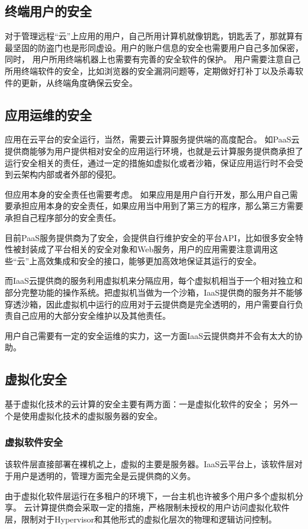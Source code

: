 \documentclass[a4paper]{ctexart}
\begin{document}
        \subsection{终端用户的安全}
            \par 对于管理远程“云”上应用的用户，自己所用计算机就像钥匙，钥匙丢了，那就算有最坚固的防盗门也是形同虚设。用户的账户信息的安全也需要用户自己多加保密，同时， 用户所用终端机器上也需要有完善的安全软件的保护。 用户需要注意自己所用终端软件的安全，比如浏览器的安全漏洞问题等，定期做好打补丁以及杀毒软件的更新，从终端角度确保云安全。

        \subsection{应用运维的安全}
            \par 应用在云平台的安全运行，当然，需要云计算服务提供端的高度配合。 如PaaS云提供商能够为用户提供相对安全的应用运行环境，也就是云计算服务提供商承担了运行安全相关的责任，通过一定的措施如虚拟化或者沙箱，保证应用运行时不会受到云架构内部或者外部的侵犯。
            \par {\color{red} 但应用本身的安全责任也需要考虑。 如果应用是用户自行开发，那么用户自己需要承担应用本身的安全责任，如果应用当中用到了第三方的程序，那么第三方需要承担自己程序部分的安全责任。}
            \par 目前PaaS服务提供商为了安全，会提供自行维护安全的平台API，比如很多安全特性被封装成了平台相关的安全对象和Web服务，用户的应用需要注意调用这些“云”上高效集成和安全的接口，能够更加高效地保证其运行的安全。
            \par 而IaaS云提供商的服务利用虚拟机来分隔应用，每个虚拟机相当于一个相对独立和部分完整功能的操作系统。把虚拟机当做为一个沙箱，IaaS提供商的服务并不能够穿透沙箱，因此虚拟机中运行的应用对于云提供商是完全透明的，用户需要自行负责自己应用的大部分安全维护以及其他责任。
            \par 用户自己需要有一定的安全运维的实力，这一方面IaaS云提供商并不会有太大的协助。

        \subsection{虚拟化安全}
        \par 基于虚拟化技术的云计算的安全主要有两方面：一是虚拟化软件的安全； 另外一个是使用虚拟化技术的虚拟服务器的安全。

        \subsubsection{虚拟软件安全}
            \par 该软件层直接部署在裸机之上，虚拟的主要是服务器。IaaS云平台上，该软件层对于用户是透明的，管理方面完全是云提供商的义务。
            \par 由于虚拟化软件层运行在多租户的环境下，一台主机也许被多个用户多个虚拟机分享。 云计算提供商会采取一定的措施，严格限制未授权的用户访问虚拟化软件层，限制对于Hypervisor和其他形式的虚拟化层次的物理和逻辑访问控制。
\end{document}

